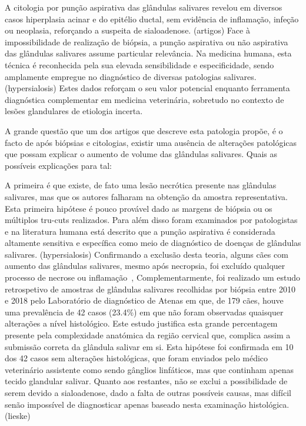 A citologia por punção aspirativa das glândulas salivares revelou em diversos casos hiperplasia acinar e do epitélio ductal, sem evidência de inflamação, infeção ou neoplasia, reforçando a suspeita de sialoadenose. (artigos) Face à impossibilidade de realização de biópsia, a punção aspirativa ou não aspirativa das glândulas salivares assume particular relevância. Na medicina humana, esta técnica é reconhecida pela sua elevada sensibilidade e especificidade, sendo amplamente empregue no diagnóstico de diversas patologias salivares. (hypersialosis) Estes dados reforçam o seu valor potencial enquanto ferramenta diagnóstica complementar em medicina veterinária, sobretudo no contexto de lesões glandulares de etiologia incerta.


A grande questão que um dos artigos que descreve esta patologia propõe, é o facto de após biópsias e citologias, existir uma ausência de alterações patológicas que possam explicar o aumento de volume das glândulas salivares.
Quais as possíveis explicações para tal:


A primeira é que existe, de fato uma lesão necrótica presente nas glândulas salivares, mas que os autores falharam na obtenção da amostra representativa. Esta primeira hipótese é pouco provável dado as margens de biópsia ou os múltiplos tru-cuts realizados. Para além disso foram examinados por patologistas e na literatura humana está descrito que a punção aspirativa é considerada altamente sensitiva e específica como meio de diagnóstico de doenças de glândulas salivares. (hypersialosis) Confirmando a exclusão desta teoria, alguns cães com aumento das glândulas salivares, mesmo após necropsia, foi excluído qualquer processo de necrose ou inflamação~\cite{schroeder_salivary_1998}, Complementarmente, foi realizado um estudo retrospetivo de amostras de glândulas salivares recolhidas por biópsia entre 2010 e 2018 pelo Laboratório de diagnóstico de Atenas em que, de 179 cães, houve uma prevalência de 42 casos (23.4\%) em que não foram observadas quaisquer alterações a nível histológico. Este estudo justifica esta grande percentagem presente pela complexidade anatómica da região cervical que, complica assim a submissão correta da glândula salivar em si. Esta hipótese foi confirmada em 10 dos 42 casos sem alterações histológicas, que foram enviados pelo médico veterinário assistente como sendo gânglios linfáticos, mas que continham apenas tecido glandular salivar. Quanto aos restantes, não se exclui a possibilidade de serem devido a sialoadenose, dado a falta de outras possíveis causas, mas difícil senão impossível de diagnosticar apenas baseado nesta examinação histológica. (lieske)



